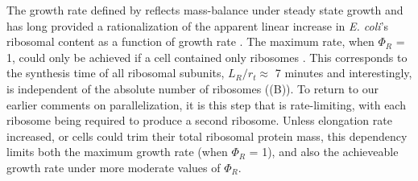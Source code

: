 The growth rate defined by  reflects
mass-balance under steady state growth and has long provided a rationalization
of the apparent linear increase in \textit{E. coli}'s ribosomal content as a
function of growth rate \citep{goldberger1979, scott2010}. The maximum rate,
when $\Phi_R$ = 1, could only be achieved if a cell contained only ribosomes \citep{dill2011}.
This corresponds to the synthesis time of all ribosomal subunits, $L_R/ r_t
\approx$ 7 minutes and interestingly, is independent of the
absolute number of ribosomes ((B)). To return to our earlier comments on
parallelization, it is this step that is rate-limiting, with each ribosome being
required to produce a second ribosome. Unless elongation rate increased, or
cells could trim their total ribosomal protein mass, this dependency limits both
the maximum growth rate (when $\Phi_R$ = 1), and also the achieveable growth
rate under more moderate values of $\Phi_R$.

